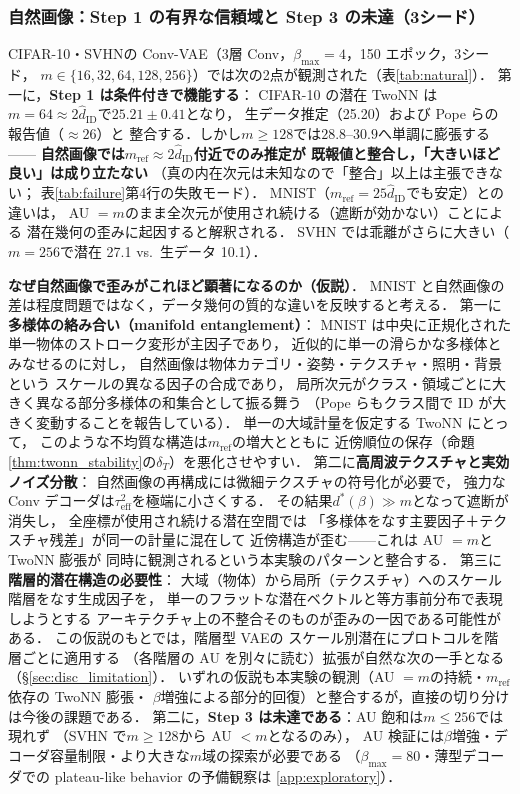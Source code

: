 \documentclass[11pt,a4paper]{jsarticle}
\newcommand{\hatdID}{\hat{d}_{\mathrm{ID}}}
\newcommand{\dstar}{d^{*}(\beta)}
\begin{document}
\subsubsection{自然画像：Step 1 の有界な信頼域と Step 3 の未達（3シード）}

CIFAR-10\cite{krizhevsky2009learning}・SVHN\cite{netzer2011reading}の
Conv-VAE（3層 Conv，$\beta_{\max} = 4$，150 エポック，3シード，
$m \in \{16, 32, 64, 128, 256\}$）では次の2点が観測された（表\ref{tab:natural}）．
第一に，\textbf{Step 1 は条件付きで機能する}：
CIFAR-10 の潜在 TwoNN は$m = 64 \approx 2\hatdID$で$25.21 \pm 0.41$となり，
生データ推定（25.20）および Pope ら\cite{pope2021intrinsic}の報告値（$\approx 26$）と
整合する．しかし$m \geq 128$では$28.8$--$30.9$へ単調に膨張する——
\textbf{自然画像では$m_{\mathrm{ref}} \approx 2\hatdID$付近でのみ推定が
既報値と整合し，「大きいほど良い」は成り立たない}
（真の内在次元は未知なので「整合」以上は主張できない；
表\ref{tab:failure}第4行の失敗モード）．
MNIST（$m_{\mathrm{ref}} = 25\hatdID$でも安定）との違いは，
AU $= m$のまま全次元が使用され続ける（遮断が効かない）ことによる
潜在幾何の歪みに起因すると解釈される．
SVHN では乖離がさらに大きい（$m = 256$で潜在 27.1 vs.\ 生データ 10.1）．

\textbf{なぜ自然画像で歪みがこれほど顕著になるのか（仮説）}．
MNIST と自然画像の差は程度問題ではなく，データ幾何の質的な違いを反映すると考える．
第一に\textbf{多様体の絡み合い（manifold entanglement）}：
MNIST は中央に正規化された単一物体のストローク変形が主因子であり，
近似的に単一の滑らかな多様体とみなせるのに対し，
自然画像は物体カテゴリ・姿勢・テクスチャ・照明・背景という
スケールの異なる因子の合成であり，
局所次元がクラス・領域ごとに大きく異なる部分多様体の和集合として振る舞う
（Pope ら\cite{pope2021intrinsic}もクラス間で ID が大きく変動することを報告している）．
単一の大域計量を仮定する TwoNN にとって，
このような不均質な構造は$m_{\mathrm{ref}}$の増大とともに
近傍順位の保存（命題\ref{thm:twonn_stability}の$\delta_T$）を悪化させやすい．
第二に\textbf{高周波テクスチャと実効ノイズ分散}：
自然画像の再構成には微細テクスチャの符号化が必要で，
強力な Conv デコーダは$\tau^2_{\mathrm{eff}}$を極端に小さくする．
その結果$\dstar \gg m$となって遮断が消失し，
全座標が使用され続ける潜在空間では
「多様体をなす主要因子＋テクスチャ残差」が同一の計量に混在して
近傍構造が歪む——これは AU $= m$と TwoNN 膨張が
同時に観測されるという本実験のパターンと整合する．
第三に\textbf{階層的潜在構造の必要性}：
大域（物体）から局所（テクスチャ）へのスケール階層をなす生成因子を，
単一のフラットな潜在ベクトルと等方事前分布で表現しようとする
アーキテクチャ上の不整合そのものが歪みの一因である可能性がある．
この仮説のもとでは，階層型 VAE\cite{sonderby2016ladder}の
スケール別潜在にプロトコルを階層ごとに適用する
（各階層の AU を別々に読む）拡張が自然な次の一手となる（§\ref{sec:disc_limitation}）．
いずれの仮説も本実験の観測（AU $= m$の持続・$m_{\mathrm{ref}}$依存の TwoNN 膨張・
$\beta$増強による部分的回復）と整合するが，直接の切り分けは今後の課題である．
第二に，\textbf{Step 3 は未達である}：AU 飽和は$m \leq 256$では現れず
（SVHN で$m \geq 128$から AU $< m$となるのみ），
AU 検証には$\beta$増強・デコーダ容量制限・より大きな$m$域の探索が必要である
（$\beta_{\max} = 80$・薄型デコーダでの plateau-like behavior の予備観察は
\ref{app:exploratory}）．
\end{document}
